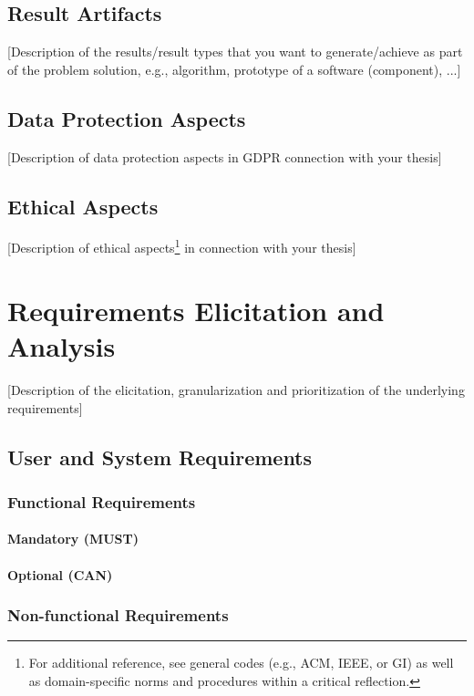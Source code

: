 \documentclass[oneside,12pt]{book}
\begin{document}
\section{Result Artifacts}
[Description of the results/result types that you want to generate/achieve as part of the problem solution, e.g., algorithm, prototype of a software (component), ...]

\section{Data Protection Aspects}
[Description of data protection aspects in \gls{GDPR} connection with your thesis]

\section{Ethical Aspects}
[Description of ethical aspects\footnote{For additional reference, see general codes (e.g., ACM, IEEE, or GI) as well as domain-specific norms and procedures within a critical reflection.} in connection with your thesis]

\chapter{Requirements Elicitation and Analysis}
[Description of the elicitation, granularization and prioritization of the underlying requirements]

\section{User and System Requirements}

\subsection{Functional Requirements}

\subsubsection{Mandatory (MUST)}

\subsubsection{Optional (CAN)}

\subsection{Non-functional Requirements}
\end{document}
